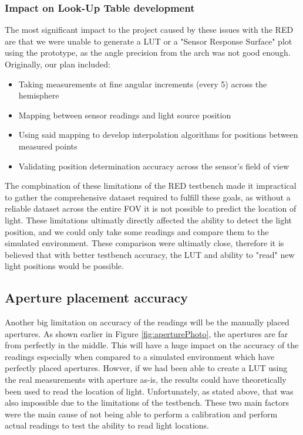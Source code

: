 \subsubsection{Impact on Look-Up Table development}

The most significant impact to the project caused by these issues with the \ac{RED} are that we were unable to generate a \ac{LUT} or a "Sensor Response Surface" plot using the prototype, as the angle precision from the arch was not good enough. Originally, our plan included:

\begin{itemize}
    \item Taking measurements at fine angular increments (every 5\textdegree{}) across the hemisphere
    \item Mapping between sensor readings and light source position
    \item Using said mapping to develop interpolation algorithms for positions between measured points
    \item Validating position determination accuracy across the sensor's field of view
\end{itemize}

The compbination of these limitations of the \ac{RED} testbench made it impractical to gather the comprehensive dataset required to fulfill these goals, as without a reliable dataset across the entire \ac{FOV} it is not possible to predict the location of light.
These limitations ultimatly directly affected the ability to detect the light position, and we could only take some readings and compare them to the simulated environment. These comparison were ultimatly close, therefore it is believed that with better testbench accuracy, the \ac{LUT} and ability to "read" new light positions would be possible.

\subsection{Aperture placement accuracy}

Another big limitation on accuracy of the readings will be the manually placed apertures. As shown earlier in Figure \ref{fig:aperturePhoto}, the apertures are far from perfectly in the middle. This will have a huge impact on the accuracy of the readings especially when compared to a simulated environment which have perfectly placed apertures. Howver, if we had been able to create a \ac{LUT} using the real measurements with aperture as-is, the results could have theoretically been used to read the location of light. Unfortunately, as stated above, that was also impossible due to the limitations of the testbench. These two main factors were the main cause of not being able to perform a calibration and perform actual readings to test the ability to read light locations. 

